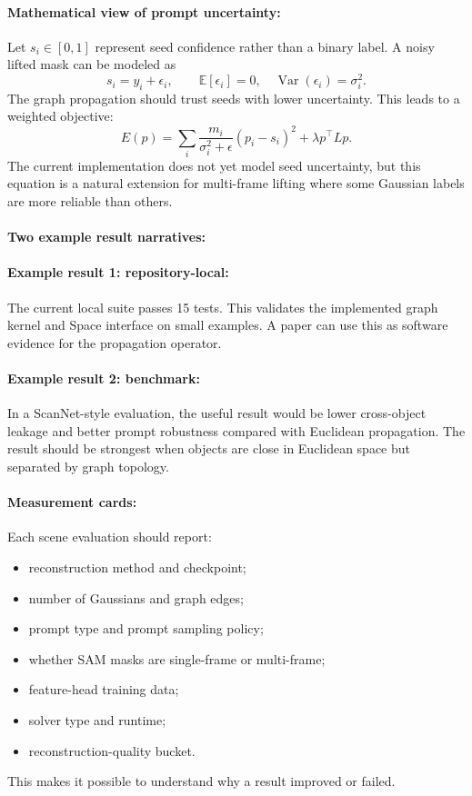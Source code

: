 \documentclass{article}
\begin{document}
\paragraph{Mathematical view of prompt uncertainty:}

Let $s_i\in[0,1]$ represent seed confidence rather than a binary label. A noisy lifted mask can be modeled as
\begin{equation}
  s_i = y_i + \epsilon_i,\qquad \mathbb{E}[\epsilon_i]=0,\quad \operatorname{Var}(\epsilon_i)=\sigma_i^2.
\end{equation}
The graph propagation should trust seeds with lower uncertainty. This leads to a weighted objective:
\begin{equation}
  E(p)=\sum_i \frac{m_i}{\sigma_i^2+\epsilon}(p_i-s_i)^2+\lambda p^\top Lp.
\end{equation}
The current implementation does not yet model seed uncertainty, but this equation is a natural extension for multi-frame lifting where some Gaussian labels are more reliable than others.

\paragraph{Two example result narratives:}

\paragraph{Example result 1: repository-local:}
The current local suite passes 15 tests. This validates the implemented graph kernel and Space interface on small examples. A paper can use this as software evidence for the propagation operator.

\paragraph{Example result 2: benchmark:}
In a ScanNet-style evaluation, the useful result would be lower cross-object leakage and better prompt robustness compared with Euclidean propagation. The result should be strongest when objects are close in Euclidean space but separated by graph topology.

\paragraph{Measurement cards:}

Each scene evaluation should report:
\begin{itemize}
  \item reconstruction method and checkpoint;
  \item number of Gaussians and graph edges;
  \item prompt type and prompt sampling policy;
  \item whether SAM masks are single-frame or multi-frame;
  \item feature-head training data;
  \item solver type and runtime;
  \item reconstruction-quality bucket.
\end{itemize}
This makes it possible to understand why a result improved or failed.
\end{document}
